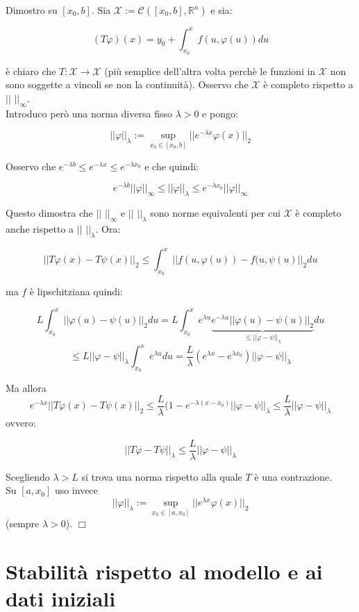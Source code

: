 \documentclass[a4paper,11pt,titlepage]{book}
\begin{document}
Dimostro su $[x_0,b]$. Sia $\mathcal{X}:=\mathcal{C}([x_0,b],\mathbb{R}^n)$ e sia:

$$(T\varphi)(x)=y_0+\int_{x_0}^x f(u,\varphi(u))du$$

è chiaro che $T:\mathcal{X}\to\mathcal{X}$ (più semplice dell'altra volta perchè le funzioni in $\mathcal{X}$ non sono soggette a vincoli se non la continuità). Osservo che $\mathcal{X}$ è completo rispetto a $||$ $||_\infty$.\\

Introduco però una norma diversa fisso $\lambda>0$ e pongo:

$$||\varphi||_\lambda:=\sup\limits_{x_0\in[x_0,b]}||e^{-\lambda x}\varphi (x)||_2$$

Osservo che $e^{-\lambda b}\leq e^{-\lambda x}\leq e^{-\lambda x_0}$ e che quindi:

$$e^{-\lambda b}||\varphi||_\infty\leq||\varphi||_\lambda\leq e^{-\lambda x_0}||\varphi||_\infty$$

Questo dimostra che $||$ $||_\infty$ e $||$ $||_\lambda$ sono norme equivalenti per cui $\mathcal{X}$ è completo anche rispetto a $||$ $||_\lambda$. Ora:

$$||T\varphi(x)-T\psi(x)||_2\leq\int_{x_0}^x ||f(u,\varphi(u))-f(u,\psi(u)||_2 du$$

ma $f$ è lipschitziana quindi:

$$L\int_{x_0}^x ||\varphi(u)-\psi(u)||_2 du=L\int_{x_0}^x e^{\lambda u}\underbrace{e^{-\lambda u} ||\varphi(u)-\psi(u)||_2}_{\leq||\varphi-\psi||_\lambda} du$$ $$\leq L||\varphi-\psi||_\lambda\int_{x_0}^x e^{\lambda u}du=\frac{L}{\lambda}(e^{\lambda x}-e^{\lambda x_0})||\varphi-\psi||_\lambda$$

Ma allora $$e^{-\lambda x}||T\varphi(x)-T\psi(x)||_2\leq\frac{L}{\lambda}(1-e^{-\lambda(x-x_0)}||\varphi-\psi||_\lambda\leq\frac{L}{\lambda}||\varphi-\psi||_\lambda$$ ovvero:

$$||T\varphi-T\psi||_\lambda\leq\frac{L}{\lambda}||\varphi-\psi||_\lambda$$

Scegliendo $\lambda>L$ si trova una norma rispetto alla quale $T$ è una contrazione.\\

Su $[a,x_0]$ uso invece $$||\varphi||_\lambda:=\sup\limits_{x_0\in[a,x_0]}||e^{\lambda x}\varphi (x)||_2$$ (sempre $\lambda>0$). $\Box$\\

\section{Stabilità rispetto al modello e ai dati iniziali}
\end{document}
